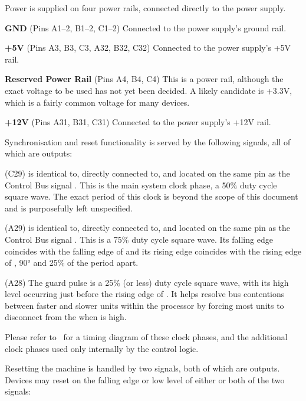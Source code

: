 Power is supplied on four power rails, connected directly to the power
supply.

\begin{description}
\item{\bfseries GND} (Pins A1–2, B1–2, C1–2) Connected
  to the power supply's ground rail.
\item{\bfseries +5V} (Pins A3, B3, C3, A32, B32, C32) Connected to the power supply's +5V rail.
\item{\bfseries Reserved Power Rail} (Pins A4, B4, C4) This is a power rail,
  although the exact voltage to be used has not yet been decided. A
  likely candidate is +3.3V, which is a fairly common voltage for many
  devices.
\item{\bfseries +12V} (Pins A31, B31, C31) Connected to the power supply's
  +12V rail.
\end{description}

Synchronisation and reset functionality is served by the following
signals, all of which are outputs:

\begin{description}
  \item{\bfseries {}} (C29) is identical to, directly connected to,
    and located on the same pin as the Control Bus signal
    . This is the main system clock phase, a 50\% duty cycle
    square wave. The exact period of this clock is beyond the scope of
    this document and is purposefully left unspecified.
  \item{\bfseries {}} (A29) is identical to, directly connected to,
    and located on the same pin as the Control Bus signal
    . This is a 75\% duty cycle square wave. Its falling edge
    coincides with the falling edge of  and its rising edge
    coincides with the rising edge of , 90° and 25\% of the
    period apart.
  \item{\bfseries\GP} (A28) The guard pulse is a 25\% (or
    less) duty cycle square wave, with its high level occurring just
    before the rising edge of . It helps resolve bus
    contentions between faster and slower units within the processor
    by forcing most units to disconnect from the \IBUS{} when \GP{} is
    high.
\end{description}

Please refer to~ for a timing diagram of these clock
phases, and the additional clock phases used only internally by the
control logic.

Resetting the machine is handled by two signals, both of which are
outputs. Devices may reset on the falling edge or low level of either
or both of the two signals:

